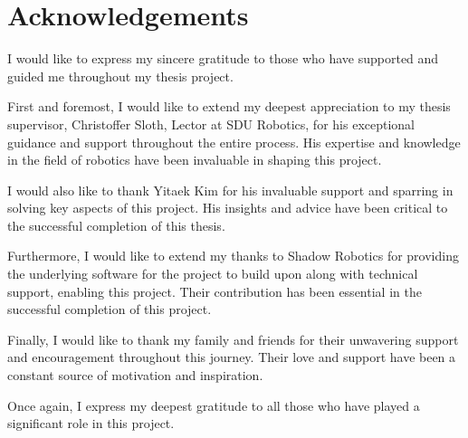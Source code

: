 \section*{Acknowledgements}

I would like to express my sincere gratitude to those who have supported and guided me throughout my thesis project. \medskip

First and foremost, I would like to extend my deepest appreciation to my thesis supervisor, Christoffer Sloth, Lector at SDU Robotics, for his exceptional guidance and support throughout the entire process. His expertise and knowledge in the field of robotics have been invaluable in shaping this project. \medskip

I would also like to thank Yitaek Kim for his invaluable support and sparring in solving key aspects of this project. His insights and advice have been critical to the successful completion of this thesis. \medskip

Furthermore, I would like to extend my thanks to Shadow Robotics for providing the underlying software for the project to build upon along with technical support, enabling this project. Their contribution has been essential in the successful completion of this project. \medskip

Finally, I would like to thank my family and friends for their unwavering support and encouragement throughout this journey. Their love and support have been a constant source of motivation and inspiration. \medskip

Once again, I express my deepest gratitude to all those who have played a significant role in this project.